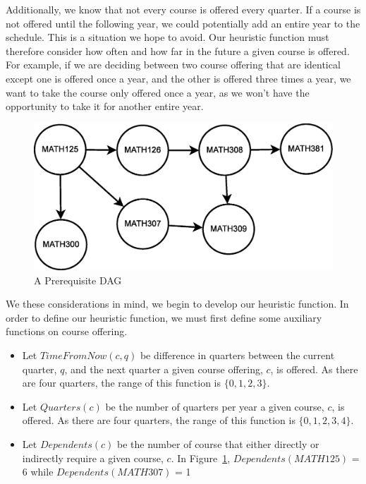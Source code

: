 \documentclass[11pt]{article} %
\begin{document}
Additionally, we know that not every course is offered every quarter. If
a course is not offered until the following year, we could potentially add an
entire year to the schedule. This is a situation we hope to avoid. Our heuristic
function must therefore consider how often and how far in the future a given
course is offered. For example, if we are deciding between two course offering
that are identical except one is offered once a year, and the other is offered
three times a year, we want to take the course only offered once a year, as we
won't have the opportunity to take it for another entire year.
\begin{figure} [ht]
    \begin{center}
        \includegraphics[scale=0.35]{more_prereq_tree}
    \end{center}
    \caption{A Prerequisite DAG}
    \label{prereq}
\end{figure}

We these considerations in mind, we begin to develop our heuristic function. In
order to define our heuristic function, we must first define some auxiliary
functions on course offering.  \begin{itemize} \item Let $TimeFromNow(c, q)$ be
difference in quarters between the current quarter, $q$, and the next quarter
a given course offering, $c$, is offered. As there are four quarters, the range
of this function is $\{0, 1, 2, 3\}$.  \item Let $Quarters(c)$ be the number of
quarters per year a given course, $c$, is offered. As there are four quarters,
the range of this function is $\{0, 1, 2, 3, 4\}$.  \item Let $Dependents(c)$ be
the number of course that either directly or indirectly require a given course,
$c$. In Figure~\ref{prereq}, $Dependents(MATH125)$ = 6 while
$Dependents(MATH307)$ = 1 \end{itemize}
\end{document}
